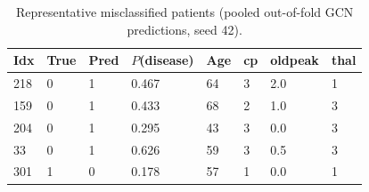 \begin{table}[t]
\centering
\caption{Representative misclassified patients (pooled out-of-fold GCN predictions, seed 42).}
\label{tab:failure}
\footnotesize
\begin{tabular}{llllllll}
\toprule
Idx & True & Pred & $P$(disease) & Age & cp & oldpeak & thal \\
\midrule
218 & 0 & 1 & 0.467 & 64 & 3 & 2.0 & 1 \\
159 & 0 & 1 & 0.433 & 68 & 2 & 1.0 & 3 \\
204 & 0 & 1 & 0.295 & 43 & 3 & 0.0 & 3 \\
33 & 0 & 1 & 0.626 & 59 & 3 & 0.5 & 3 \\
301 & 1 & 0 & 0.178 & 57 & 1 & 0.0 & 1 \\
\bottomrule
\end{tabular}
\end{table}
